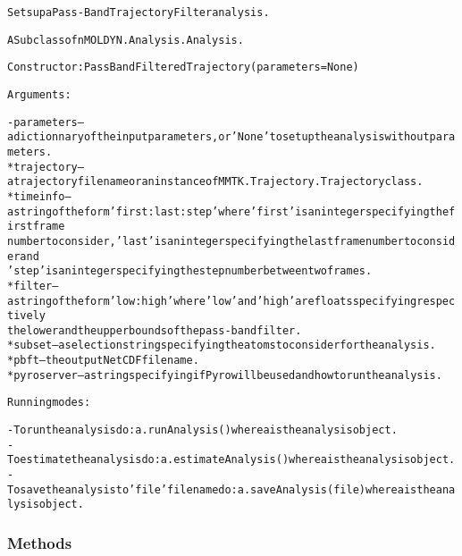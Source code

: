 \begin{alltt}
Sets up a Pass-Band Trajectory Filter analysis.

A Subclass of nMOLDYN.Analysis.Analysis. 

Constructor: PassBandFilteredTrajectory({\textbar}parameters{\textbar} = None)

Arguments:

    - {\textbar}parameters{\textbar} -- a dictionnary of the input parameters, or 'None' to set up the analysis without parameters.
        * trajectory -- a trajectory file name or an instance of MMTK.Trajectory.Trajectory class.
        * timeinfo   -- a string of the form 'first:last:step' where 'first' is an integer specifying the first frame 
                        number to consider, 'last' is an integer specifying the last frame number to consider and 
                        'step' is an integer specifying the step number between two frames.
        * filter     -- a string of the form 'low:high' where 'low' and 'high' are floats specifying respectively 
                        the lower and the upper bounds of the pass-band filter.
        * subset     -- a selection string specifying the atoms to consider for the analysis.
        * pbft       -- the output NetCDF file name.
        * pyroserver -- a string specifying if Pyro will be used and how to run the analysis.
    
Running modes:

    - To run the analysis do: a.runAnalysis() where a is the analysis object.
    - To estimate the analysis do: a.estimateAnalysis() where a is the analysis object.
    - To save the analysis to 'file' file name do: a.saveAnalysis(file) where a is the analysis object.
\end{alltt}



  \subsubsection{Methods}

    \vspace{0.5ex}

